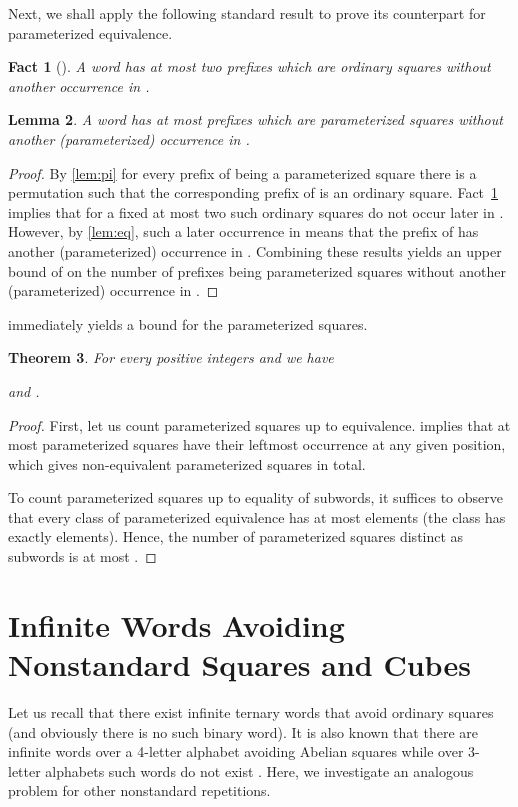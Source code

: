\documentclass{article}
\theoremstyle{plain}
\newtheorem{theorem}{Theorem}[section]
\newtheorem{lemma}[theorem]{Lemma}
\newtheorem{fact}[theorem]{Fact}
\theoremstyle{definition}
\theoremstyle{remark}
\begin{document}
 Next, we shall apply the following standard result to prove its counterpart for parameterized equivalence.
  \begin{fact}[\cite{fraenkel-simpson}]\label{fct:fraenkel}
  A word  has at most two prefixes which are ordinary squares without another occurrence in .
  \end{fact}
  
\begin{lemma}\label{lem:factorial}
A word  has at most  prefixes which are parameterized squares
without another (parameterized) occurrence in .
\end{lemma}
\begin{proof}
By \cref{lem:pi} for every prefix of  being a parameterized square there is a permutation 
such that the corresponding prefix of  is an ordinary square. Fact~\ref{fct:fraenkel} implies
that for a fixed  at most two such ordinary squares do not occur later in . However,
by \cref{lem:eq}, such a later occurrence in  means that the prefix of  has
another (parameterized) occurrence in . Combining these results yields an upper bound of 
on the number of prefixes being parameterized squares
without another (parameterized) occurrence in .
\end{proof}

 immediately yields a bound for the parameterized squares.

\begin{theorem}
For every positive integers  and  we have 
     
    and .
\end{theorem} 
\begin{proof}
First, let us count parameterized squares up to equivalence.
 implies that at most  parameterized squares have their leftmost occurrence
at any given position, which gives  non-equivalent parameterized squares in total.

To count parameterized squares up to equality of subwords, it suffices to observe that
every class of parameterized equivalence has at most  elements (the class  has exactly  elements).
Hence, the number of parameterized squares distinct as subwords is at most . 
\end{proof}


\section{Infinite Words Avoiding Nonstandard Squares and Cubes}\label{sec:infinite}
  Let us recall that there exist infinite ternary words that avoid ordinary squares \cite{Thue}
  (and obviously there is no such binary word).
  It is also known that there are infinite words over a 4-letter alphabet avoiding Abelian squares
  while over 3-letter alphabets such words do not exist \cite{DBLP:conf/icalp/Keranen92}.
  Here, we investigate an analogous problem for other nonstandard repetitions.
\end{document}

